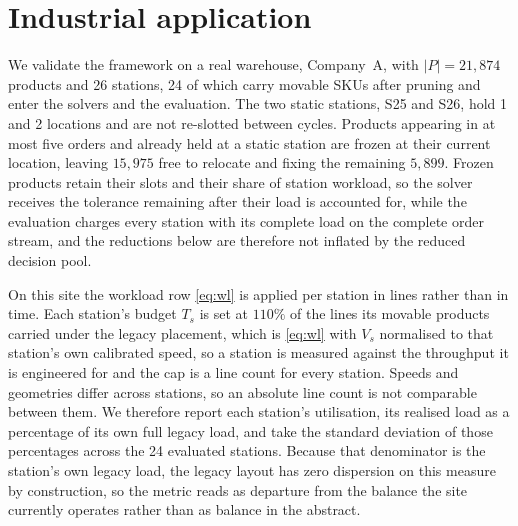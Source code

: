 \documentclass[]{interact}
\begin{document}
\section{Industrial application}\label{sec:industrial}
We validate the framework on a real warehouse, Company~A, with $|P| = 21{,}874$ products and 26 stations, 24 of which carry movable SKUs after pruning and enter the solvers and the evaluation. The two static stations, S25 and S26, hold 1 and 2 locations and are not re-slotted between cycles. Products appearing in at most five orders and already held at a static station are frozen at their current location, leaving $15{,}975$ free to relocate and fixing the remaining $5{,}899$. Frozen products retain their slots and their share of station workload, so the solver receives the tolerance remaining after their load is accounted for, while the evaluation charges every station with its complete load on the complete order stream, and the reductions below are therefore not inflated by the reduced decision pool.

On this site the workload row \eqref{eq:wl} is applied per station in lines rather than in time. Each station's budget $T_s$ is set at $110\%$ of the lines its movable products carried under the legacy placement, which is \eqref{eq:wl} with $V_s$ normalised to that station's own calibrated speed, so a station is measured against the throughput it is engineered for and the cap is a line count for every station. Speeds and geometries differ across stations, so an absolute line count is not comparable between them. We therefore report each station's utilisation, its realised load as a percentage of its own full legacy load, and take the standard deviation of those percentages across the 24 evaluated stations. Because that denominator is the station's own legacy load, the legacy layout has zero dispersion on this measure by construction, so the metric reads as departure from the balance the site currently operates rather than as balance in the abstract.
\end{document}
